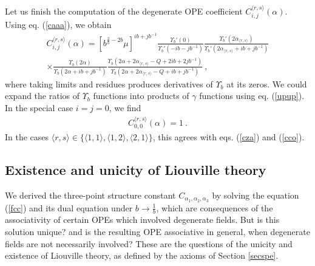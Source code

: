 \documentclass[12pt,a4paper,notitlepage]{report}
\numberwithin{equation}{section}
\theoremstyle{break}
\begin{document}
Let us finish the computation of the degenerate OPE coefficient $C_{i,j}^{\langle r,s \rangle}(\alpha)$. Using eq. (\ref{caaa}), we obtain 
\begin{multline}
 C_{i,j}^{\langle r,s \rangle}(\alpha) = \left[b^{\frac{2}{b}-2b}\mu\right]^{ib+jb^{-1}} \frac{\Upsilon_b'(0)}{\Upsilon_b'(-ib-jb^{-1})} \frac{\Upsilon_b'(2\alpha_{\langle r,s \rangle})}{\Upsilon_b'(2\alpha_{\langle r,s \rangle}+ib+jb^{-1})}
\\ \times
 \frac{\Upsilon_b(2\alpha)}{\Upsilon_b(2\alpha+ib+jb^{-1})} \frac{\Upsilon_b(2\alpha+2\alpha_{\langle r,s \rangle}-Q+2ib+2jb^{-1})}{\Upsilon_b(2\alpha+2\alpha_{\langle r,s \rangle}-Q+ib+jb^{-1})} \ ,
\end{multline}
where taking limits and residues produces derivatives of $\Upsilon_b$ at its zeros. We could expand the ratios of $\Upsilon_b$ functions into products of $\gamma$ functions using eq. (\ref{upup}). In the special case $i=j=0$, we find
\begin{align}
 C_{0,0}^{\langle r,s \rangle}(\alpha) = 1 \ .
\end{align}
In the cases $\langle r,s \rangle \in \{\langle 1,1 \rangle , \langle 1,2 \rangle, \langle 2,1 \rangle\}$, 
this agrees with eqs. (\ref{cza}) and (\ref{cco}).  

\subsection{Existence and unicity of Liouville theory}

We derived the three-point structure constant $C_{\alpha_1,\alpha_2,\alpha_3}$ by solving the equation (\ref{fcc}) and its dual equation under $b\rightarrow \frac{1}{b}$, which are consequences of the associativity of certain OPEs which involved degenerate fields. But is this solution unique? and is the resulting OPE associative in general, when degenerate fields are not necessarily involved? These are the questions of the unicity and existence of Liouville theory, as defined by the axioms of Section \ref{secspe}.
\end{document}

